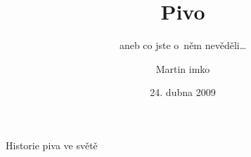 \documentclass[pdf,slideColor,fyma]{prosper}
\begin{document}
\title{Pivo}
\subtitle{aneb co jste o~něm nevěděli\dots}
\author{Martin imko}
\date{24. dubna 2009}
\maketitle

\begin{slide}{Historie piva ve světě}
\begin{itemize}

\end{itemize}

\end{slide}
\end{document}
